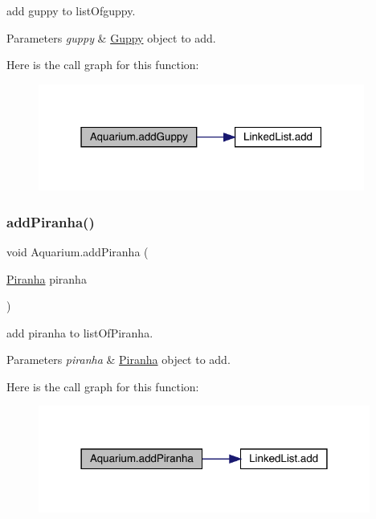 add guppy to list\+Ofguppy. 
\begin{DoxyParams}{Parameters}
{\em guppy} & \mbox{\hyperlink{class_guppy}{Guppy}} object to add. \\
\hline
\end{DoxyParams}
Here is the call graph for this function\+:
\nopagebreak
\begin{figure}[H]
\begin{center}
\leavevmode
\includegraphics[width=304pt]{class_aquarium_a4deb3514c2e387b5d3e33424c18144c1_cgraph}
\end{center}
\end{figure}
\mbox{\label{class_aquarium_a30faca886e988aa80f512086cd817588}} 
\subsubsection{\texorpdfstring{add\+Piranha()}{addPiranha()}}
{\footnotesize\ttfamily void Aquarium.\+add\+Piranha (\begin{DoxyParamCaption}\item[{\mbox{\hyperlink{class_piranha}{Piranha}}}]{piranha }\end{DoxyParamCaption})\hspace{0.3cm}{\ttfamily [inline]}}

add piranha to list\+Of\+Piranha. 
\begin{DoxyParams}{Parameters}
{\em piranha} & \mbox{\hyperlink{class_piranha}{Piranha}} object to add. \\
\hline
\end{DoxyParams}
Here is the call graph for this function\+:
\nopagebreak
\begin{figure}[H]
\begin{center}
\leavevmode
\includegraphics[width=309pt]{class_aquarium_a30faca886e988aa80f512086cd817588_cgraph}
\end{center}
\end{figure}
\mbox{\label{class_aquarium_af6a186c92c1f91f92ae382416b77d3c3}} 
